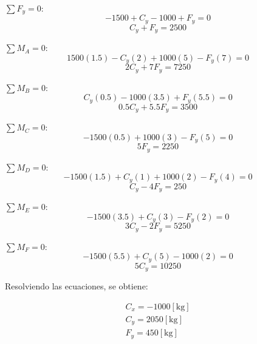\documentclass[letter,10pt,twoside]{article}
\begin{document}
$\sum{F_y} = 0$:
\begin{equation*}
    -1500 + C_y - 1000 + F_y = 0
\end{equation*}
\begin{equation*}
    C_y + F_y = 2500
\end{equation*}

$\sum{M_A} = 0$:
\begin{equation*}
    1500(1.5) - C_y(2) + 1000(5) - F_y(7) = 0
\end{equation*}
\begin{equation*}
    2 C_y + 7 F_y = 7250
\end{equation*}

$\sum{M_B} = 0$:
\begin{equation*}
    C_y(0.5) - 1000(3.5) + F_y(5.5) = 0
\end{equation*}
\begin{equation*}
    0.5 C_y + 5.5 F_y = 3500
\end{equation*}

$\sum{M_C} = 0$:
\begin{equation*}
    -1500(0.5) + 1000(3) - F_y(5) = 0
\end{equation*}
\begin{equation*}
    5 F_y = 2250
\end{equation*}

$\sum{M_D} = 0$:
\begin{equation*}
    -1500(1.5) + C_y(1) + 1000(2) - F_y(4) = 0
\end{equation*}
\begin{equation*}
    C_y - 4 F_y = 250
\end{equation*}

$\sum{M_E} = 0$:
\begin{equation*}
    -1500(3.5) + C_y(3) - F_y(2) = 0
\end{equation*}
\begin{equation*}
    3 C_y - 2 F_y = 5250
\end{equation*}

$\sum{M_F} = 0$:
\begin{equation*}
    -1500(5.5) + C_y(5) - 1000(2) = 0
\end{equation*}
\begin{equation*}
    5 C_y = 10250
\end{equation*}

Resolviendo las ecuaciones, se obtiene:

\begin{equation*}
\boxed{
    \begin{array}{l}
        C_x = -1000[\text{kg}] \\
        C_y = 2050[\text{kg}] \\
        F_y = 450[\text{kg}]
    \end{array}
}
\end{equation*}
\end{document}

